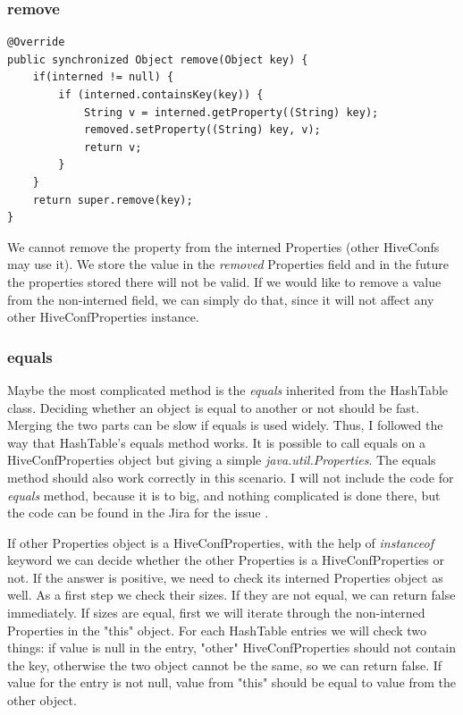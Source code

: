 \subsubsection{remove}
\begin{lstlisting}
@Override
public synchronized Object remove(Object key) {
	if(interned != null) {
		if (interned.containsKey(key)) {	
			String v = interned.getProperty((String) key);
			removed.setProperty((String) key, v);
			return v;
		}
	}
	return super.remove(key);
}
\end{lstlisting}
We cannot remove the property from the interned Properties (other HiveConfs may use it). We store the value in the \textit{removed} Properties field and in the future the properties stored there will not be valid. If we would like to remove a value from the non-interned field, we can simply do that, since it will not affect any other HiveConfProperties instance.

\subsubsection{equals}
Maybe the most complicated method is the \textit{equals} inherited from the HashTable class. Deciding whether an object is equal to another or not should be fast. Merging the two parts can be slow if equals is used widely. Thus, I followed the way that HashTable's equals method works. It is possible to call equals on a HiveConfProperties object but giving a simple \textit{java.util.Properties}. The equals method should also work correctly in this scenario. I will not include the code for \textit{equals} method, because it is to big, and nothing complicated is done there, but the code can be found in the Jira for the issue \cite{hive-conf}.

If other Properties object is a HiveConfProperties, with the help of \textit{instanceof} keyword we can decide whether the other Properties is a HiveConfProperties or not. If the answer is positive, we need to check its interned Properties object as well. As a first step we check their sizes. If they are not equal, we can return false immediately. If sizes are equal, first we will iterate through the non-interned Properties in the "this" object. For each HashTable entries we will check two things: if value is null in the entry, "other" HiveConfProperties should not contain the key, otherwise the two object cannot be the same, so we can return false. If value for the entry is not null, value from "this" should be equal to value from the other object. 

